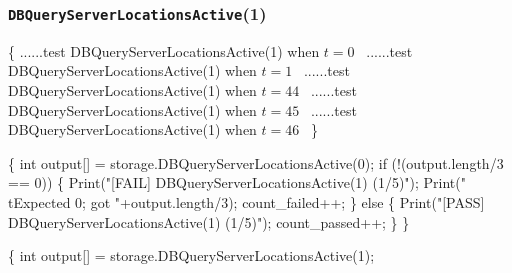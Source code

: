 \documentclass{article}
\def\nwendcode{\endtrivlist \endgroup}
\let\nwdocspar=\par
\theoremstyle{definition}
\begin{document}
\subsubsection{{\tt{}DBQueryServerLocationsActive}(1)}
\nwenddocs{}\endmoddef{}
\{
  \LA{}......test \code{}DBQueryServerLocationsActive\edoc{}(1) when $t=0$~{\nwtagstyle{}}\RA{}
  \LA{}......test \code{}DBQueryServerLocationsActive\edoc{}(1) when $t=1$~{\nwtagstyle{}}\RA{}
  \LA{}......test \code{}DBQueryServerLocationsActive\edoc{}(1) when $t=44$~{\nwtagstyle{}}\RA{}
  \LA{}......test \code{}DBQueryServerLocationsActive\edoc{}(1) when $t=45$~{\nwtagstyle{}}\RA{}
  \LA{}......test \code{}DBQueryServerLocationsActive\edoc{}(1) when $t=46$~{\nwtagstyle{}}\RA{}
\}
\nwendcode{}\nwdocspar
\nwenddocs{}\endmoddef{}
\{
  int output[] = storage.DBQueryServerLocationsActive(0);
  if (!(output.length/3 == 0)) \{
    Print("[FAIL] DBQueryServerLocationsActive(1) (1/5)");
    Print("\\tExpected 0; got "+output.length/3);
    count_failed++;
  \} else \{
    Print("[PASS] DBQueryServerLocationsActive(1) (1/5)");
    count_passed++;
  \}
\}
\nwendcode{}\nwdocspar
\nwenddocs{}\endmoddef{}
\{
  int output[] = storage.DBQueryServerLocationsActive(1);
\end{document}
